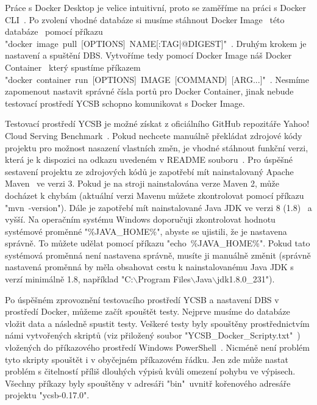 \documentclass[czech,master,dept460,male,csharp,cpdeclaration]{diploma}
\begin{document}
	Práce s Docker Desktop je velice intuitivní, proto se zaměříme na práci s Docker CLI~\cite{docker-cli}. Po zvolení vhodné databáze si musíme stáhnout Docker Image~\cite{docker-image-container} této databáze~\cite{docker-hub} pomocí příkazu "docker~image~pull~[OPTIONS]~NAME[:TAG|@DIGEST]"~\cite{docker-image-pull}. Druhým krokem je nastavení a spuštění DBS. Vytvoříme tedy pomocí Docker Image náš Docker Container~\cite{docker-image-container} který spustíme příkazem "docker~container~run~[OPTIONS]~IMAGE~[COMMAND]~[ARG...]"~\cite{docker-container-run}. Nesmíme zapomenout nastavit správné čísla portů pro Docker Container, jinak nebude testovací prostředí YCSB schopno komunikovat s Docker Image. 
	
	Testovací prostředí YCSB je možné získat z oficiálního GitHub repozitáře Yahoo! Cloud Serving Benchmark~\cite{ycsb}. Pokud nechcete manuálně překládat zdrojové kódy projektu pro možnost nasazení vlastních změn, je vhodné stáhnout funkční verzi, která je k dispozici na odkazu uvedeném v README souboru~\cite{ycsb-download}. Pro úspěšné sestavení projektu ze zdrojových kódů je zapotřebí mít nainstalovaný Apache Maven~\cite{maven} ve verzi 3. Pokud je na stroji nainstalována verze Maven 2, může docházet k chybám (aktuální verzi Mavenu můžete zkontrolovat pomocí příkazu "mvn~-version"). Dále je zapotřebí mít nainstalované Java JDK ve verzi 8 (1.8)~\cite{java-jdk} a vyšší. Na operačním systému Windows doporučuji zkontrolovat hodnotu systémové proměnné "\%JAVA\_HOME\%", abyste se ujistili, že je nastavena správně. To můžete udělat pomocí příkazu "echo~\%JAVA\_HOME\%". Pokud tato systémová proměnná není nastavena správně, musíte ji manuálně změnit (správně nastavená proměnná by měla obsahovat cestu k nainstalovanému Java JDK s verzí minimálně 1.8, například  "C:$\backslash$Program Files$\backslash$Java$\backslash$jdk1.8.0\_231").
	
	Po úspěšném zprovoznění testovacího prostředí YCSB a nastavení DBS v prostředí Docker, můžeme začít spouštět testy. Nejprve musíme do databáze vložit data a následně spustit testy. Veškeré testy byly spouštěny prostřednictvím námi vytvořených skriptů (viz přiložený soubor "YCSB\_Docker\_Scripty.txt"~\cite{skripty-soubor}) vložených do příkazového prostředí Windows PowerShell~\cite{win-powershell}. Nicméně není problém tyto skripty spouštět i v obyčejném příkazovém řádku. Jen zde může nastat problém s čitelností příliš dlouhých výpisů kvůli omezení pohybu ve výpisech. Všechny příkazy byly spouštěny v adresáři "bin"~uvnitř kořenového adresáře projektu "ycsb-0.17.0".
	
\end{document}

